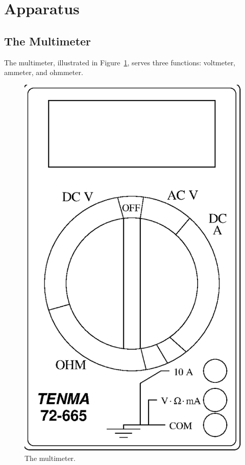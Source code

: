 \section{Apparatus}

\subsection{The Multimeter}

The multimeter, illustrated in Figure~\ref{fig:DC:multimeter}, serves three 
functions: voltmeter, ammeter, and ohmmeter. 
\begin{figure}[htb]
\centering \epsfxsize=6cm \includegraphics[scale=0.7]{2_dc/multimeter.eps}
\caption{The multimeter.}
\label{fig:DC:multimeter}
\end{figure}
